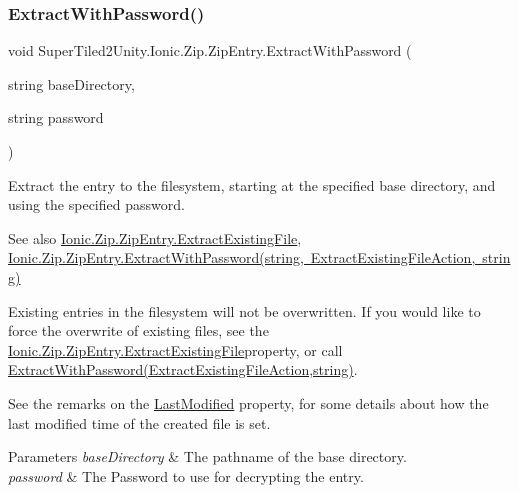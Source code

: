\subsubsection{\texorpdfstring{Extract\+With\+Password()}{ExtractWithPassword()}\hspace{0.1cm}{\footnotesize\ttfamily [2/5]}}
{\footnotesize\ttfamily void Super\+Tiled2\+Unity.\+Ionic.\+Zip.\+Zip\+Entry.\+Extract\+With\+Password (\begin{DoxyParamCaption}\item[{string}]{base\+Directory,  }\item[{string}]{password }\end{DoxyParamCaption})}



Extract the entry to the filesystem, starting at the specified base directory, and using the specified password. 

\begin{DoxySeeAlso}{See also}
\mbox{\hyperlink{class_super_tiled2_unity_1_1_ionic_1_1_zip_1_1_zip_entry_ad1ab903c29b91edb82e7c6a9768552dd}{Ionic.\+Zip.\+Zip\+Entry.\+Extract\+Existing\+File}}, \mbox{\hyperlink{class_super_tiled2_unity_1_1_ionic_1_1_zip_1_1_zip_entry_af015f9309029c100d5e2fb03bb884024}{Ionic.\+Zip.\+Zip\+Entry.\+Extract\+With\+Password(string, Extract\+Existing\+File\+Action, string)}}


\end{DoxySeeAlso}


Existing entries in the filesystem will not be overwritten. If you would like to force the overwrite of existing files, see the \mbox{\hyperlink{class_super_tiled2_unity_1_1_ionic_1_1_zip_1_1_zip_entry_ad1ab903c29b91edb82e7c6a9768552dd}{Ionic.\+Zip.\+Zip\+Entry.\+Extract\+Existing\+File}}property, or call \mbox{\hyperlink{class_super_tiled2_unity_1_1_ionic_1_1_zip_1_1_zip_entry_a99571d1031642000580642b2a3028394}{Extract\+With\+Password(\+Extract\+Existing\+File\+Action,string)}}. 

See the remarks on the \mbox{\hyperlink{class_super_tiled2_unity_1_1_ionic_1_1_zip_1_1_zip_entry_acd1234fd27c216b59c166c2b96aba3dd}{Last\+Modified}} property, for some details about how the last modified time of the created file is set. 


\begin{DoxyParams}{Parameters}
{\em base\+Directory} & The pathname of the base directory.\\
\hline
{\em password} & The Password to use for decrypting the entry.\\
\hline
\end{DoxyParams}
\mbox{\label{class_super_tiled2_unity_1_1_ionic_1_1_zip_1_1_zip_entry_a99571d1031642000580642b2a3028394}} 
